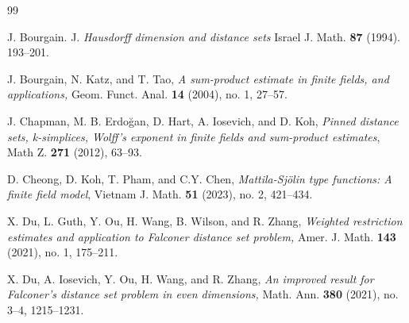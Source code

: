 \documentclass[a4paper,11pt]{amsart}
\numberwithin{equation}{section}
\begin{document}
\begin{thebibliography}{99}


J. Bourgain. J. \textit{Hausdorff dimension and distance sets}
Israel J. Math. \textbf{87} (1994). 193--201. 

J. Bourgain, N. Katz, and T. Tao, \textit{A sum-product estimate in finite fields, and applications,}
Geom. Funct. Anal. \textbf{14} (2004), no. 1, 27--57.

 J. Chapman, M. B. Erdo\u{g}an, D. Hart, A. Iosevich, and D. Koh, {\it Pinned distance sets, k-simplices, Wolff's exponent in finite fields and sum-product estimates}, Math Z. \textbf{271} (2012), 63--93.



 D. Cheong, D. Koh, T. Pham, and C.Y. Chen, \textit{Mattila-Sj\"{o}lin type functions: A finite field model}, Vietnam J. Math. \textbf{51} (2023),  no. 2, 421--434. 







X. Du, L. Guth, Y. Ou, H. Wang, B. Wilson, and R. Zhang,
\textit{Weighted restriction estimates and application to Falconer distance set problem,}
Amer. J. Math. \textbf{143} (2021), no. 1, 175--211.

 X. Du, A. Iosevich, Y. Ou, H. Wang, and R. Zhang, \textit{An improved result for Falconer's distance set problem in even dimensions,} Math. Ann. \textbf{380} (2021), no. 3--4, 1215--1231.


\end{thebibliography}
\end{document}
